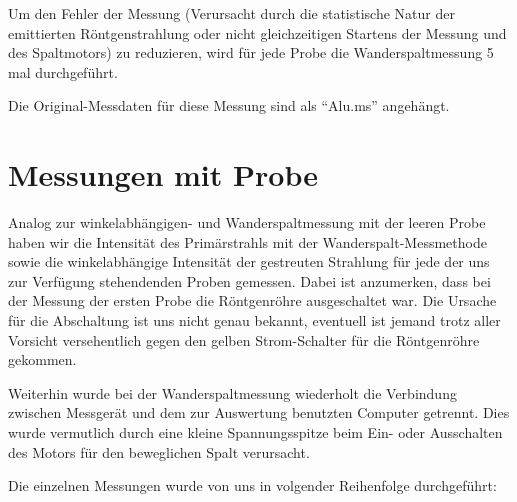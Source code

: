 \documentclass[bigchapter,colorback,accentcolor=tud4b,linedtoc,11pt]{tudreport}
\begin{document}
Um den Fehler der Messung (Verursacht durch die statistische Natur der emittierten Röntgenstrahlung oder nicht gleichzeitigen Startens der Messung und des Spaltmotors) zu reduzieren, wird für jede Probe die Wanderspaltmessung 5 mal durchgeführt.

Die Original-Messdaten für diese Messung sind als "`Alu.ms"' angehängt.

\section{Messungen mit Probe}
Analog zur winkelabhängigen- und Wanderspaltmessung mit der leeren Probe haben wir die Intensität des Primärstrahls mit der Wanderspalt-Messmethode sowie die winkelabhängige Intensität der gestreuten Strahlung für jede der uns zur Verfügung stehendenden Proben gemessen. Dabei ist anzumerken, dass bei der Messung der ersten Probe die Röntgenröhre ausgeschaltet war. Die Ursache für die Abschaltung ist uns nicht genau bekannt, eventuell ist jemand trotz aller Vorsicht versehentlich gegen den gelben Strom-Schalter für die Röntgenröhre gekommen.

Weiterhin wurde bei der Wanderspaltmessung wiederholt die Verbindung zwischen Messgerät und dem zur Auswertung benutzten Computer getrennt. Dies wurde vermutlich durch eine kleine Spannungsspitze beim Ein- oder Ausschalten des Motors für den beweglichen Spalt verursacht.

Die einzelnen Messungen wurde von uns in volgender Reihenfolge durchgeführt:
\end{document}
